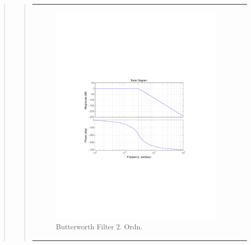 \begin{quote}
\begin{quote}
\begin{tabular}{ll}
\begin{minipage}{0.6\textwidth}
                \begin{figure}[H]
                    \label{fig:butter_2} 
                    \includegraphics[scale=0.7, trim = 3.5cm 7cm 3.5cm 7cm, clip]{Bilder/butter_8} %
                    \caption{Butterworth Filter 2. Ordn.}
                \end{figure}


            \end{minipage}
            

\end{tabular}
\end{quote}
\end{quote}
